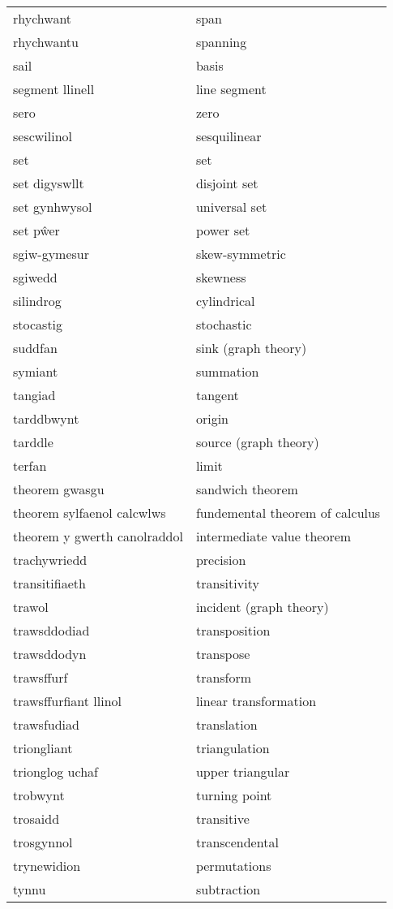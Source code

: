 \begin{supertabular}{p{0.22\textwidth}p{0.22\textwidth}}
rhychwant & span \\
rhychwantu & spanning \\
sail & basis \\
segment llinell & line segment \\
sero & zero \\
sescwilinol & sesquilinear \\
set & set \\
set digyswllt & disjoint set \\
set gynhwysol & universal set \\
set pŵer & power set \\
sgiw-gymesur & skew-symmetric \\
sgiwedd & skewness \\
silindrog & cylindrical \\
stocastig & stochastic \\
suddfan & sink (graph theory) \\
symiant & summation \\
tangiad & tangent \\
tarddbwynt & origin \\
tarddle & source (graph theory) \\
terfan & limit \\
theorem gwasgu & sandwich theorem \\
theorem sylfaenol calcwlws & fundemental theorem of calculus \\
theorem y gwerth canolraddol & intermediate value theorem \\
trachywriedd & precision \\
transitifiaeth & transitivity \\
trawol & incident (graph theory) \\
trawsddodiad & transposition \\
trawsddodyn & transpose \\
trawsffurf & transform \\
trawsffurfiant llinol & linear transformation \\
trawsfudiad & translation \\
triongliant & triangulation \\
trionglog uchaf & upper triangular \\
trobwynt & turning point \\
trosaidd & transitive \\
trosgynnol & transcendental \\
trynewidion & permutations \\
tynnu & subtraction \\

\end{supertabular}
